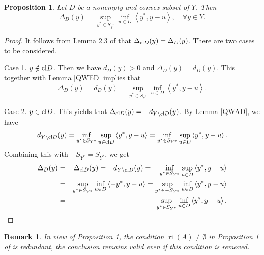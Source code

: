 \documentclass[11pt]{article}
\newtheorem{proposition}{Proposition}[section]
\newtheorem{remark}{Remark}[section]
\begin{document}
\begin{proposition} \label{wqaz} Let $D$ be a nonempty and convex subset of $Y$. Then 
	$${\Delta _D}(y) = \mathop {\sup }\limits_{{y^*} \in {S_{{Y^*}}}} \mathop {\inf }\limits_{u \in D} \left\langle {{y^*},y - u} \right\rangle , \quad \forall y \in Y.$$	
\end{proposition} 
\begin{proof}  It follows from      Lemma 2.3 of \cite{Han2022} that ${\Delta _{{\rm{cl}}D}}(y) = {\Delta _D}(y)$.  There are two cases to be considered.

Case 1. $y \notin {\rm{cl}}D$. Then we have ${d_D}\left( y \right) > 0$ and ${\Delta _D}\left( y \right) = {d_D}\left( y \right)$. This together with  Lemma  \ref{QWED}  implies that 
$${\Delta _D}\left( y \right) = {d_D}\left( y \right) = \mathop {\sup }\limits_{{y^*} \in {S_{{Y^*}}}} \mathop {\inf }\limits_{u \in D} \left\langle {{y^*},y - u} \right\rangle .$$	

Case 2. $y \in {\rm{cl}}D$.  This yields    that ${\Delta _{{\rm{cl}}D}}(y) =  - {d_{Y\backslash {\rm{cl}}D}}(y)$. By Lemma  \ref{QWAD}, we have 
$${d_{Y\backslash {\rm{cl}}D}}(y) = \mathop {\inf }\limits_{{y^*} \in {S_{{Y^*}}}} \mathop {\sup }\limits_{u \in {\rm{cl}}D} \left\langle {{y^*},y - u} \right\rangle = \mathop {\inf }\limits_{{y^*} \in {S_{{Y^*}}}} \mathop {\sup }\limits_{u \in D} \left\langle {{y^*},y - u} \right\rangle .$$
Combining this with  $ - {S_{{Y^*}}} = {S_{{Y^*}}}$, we get
\begin{eqnarray*} {\Delta _D}(y) &=& {\Delta _{{\rm{cl}}D}}(y) =  - {d_{Y\backslash {\rm{cl}}D}}(y) = - \mathop {\inf }\limits_{{y^*} \in {S_{{Y^*}}}} \mathop {\sup }\limits_{u \in D} \left\langle {{y^*},y - u} \right\rangle \\
	&=& \mathop {\sup }\limits_{{y^*} \in {S_{{Y^*}}}} \mathop {\inf }\limits_{u \in D} \left\langle { - {y^*},y - u} \right\rangle = \mathop {\sup }\limits_{{y^*} \in  - {S_{{Y^*}}}} \mathop {\inf }\limits_{u \in D} \left\langle {{y^*},y - u} \right\rangle  \\
	&=& \mathop {\sup }\limits_{{y^*} \in {S_{{Y^*}}}} \mathop {\inf }\limits_{u \in D} \left\langle {{y^*},y - u} \right\rangle .		
\end{eqnarray*}
 \end{proof}  


\begin{remark}  In view of Proposition \ref{wqaz},       the condition \(\operatorname{ri}(A) \neq \emptyset\) in Proposition 1 of \cite{LiuNgYang2009} is redundant,  the conclusion remains valid even if this condition is removed.
   \end{remark}
\end{document}
